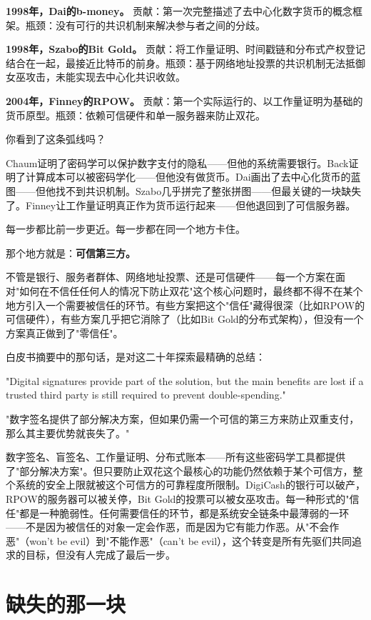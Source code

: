 \documentclass[a4paper,12pt,openany]{ctexbook}
\newenvironment{quoting}{%
  \par\vspace{0.5em}%
  \begin{list}{}{%
    \setlength{\leftmargin}{2em}%
    \setlength{\rightmargin}{2em}%
    \setlength{\parsep}{0.3em}%
    \setlength{\itemsep}{0pt}%
    \setlength{\topsep}{0pt}%
  }%
  \item\relax
}{%
  \end{list}%
  \par\vspace{0.5em}%
}
\begin{document}
\textbf{1998年，Dai的b-money。} 贡献：第一次完整描述了去中心化数字货币的概念框架。瓶颈：没有可行的共识机制来解决参与者之间的分歧。

\textbf{1998年，Szabo的Bit Gold。} 贡献：将工作量证明、时间戳链和分布式产权登记结合在一起，最接近比特币的前身。瓶颈：基于网络地址投票的共识机制无法抵御女巫攻击，未能实现去中心化共识收敛。

\textbf{2004年，Finney的RPOW。} 贡献：第一个实际运行的、以工作量证明为基础的货币原型。瓶颈：依赖可信硬件和单一服务器来防止双花。

你看到了这条弧线吗？

Chaum证明了密码学可以保护数字支付的隐私——但他的系统需要银行。Back证明了计算成本可以被密码学化——但他没有做货币。Dai画出了去中心化货币的蓝图——但他找不到共识机制。Szabo几乎拼完了整张拼图——但最关键的一块缺失了。Finney让工作量证明真正作为货币运行起来——但他退回到了可信服务器。

每一步都比前一步更近。每一步都在同一个地方卡住。

那个地方就是：\textbf{可信第三方。}

不管是银行、服务者群体、网络地址投票、还是可信硬件——每一个方案在面对"如何在不信任任何人的情况下防止双花"这个核心问题时，最终都不得不在某个地方引入一个需要被信任的环节。有些方案把这个"信任"藏得很深（比如RPOW的可信硬件），有些方案几乎把它消除了（比如Bit Gold的分布式架构），但没有一个方案真正做到了"零信任"。

白皮书摘要中的那句话，是对这二十年探索最精确的总结：


\begin{quoting}
\small
"Digital signatures provide part of the solution, but the main benefits are lost if a trusted third party is still required to prevent double-spending."

"数字签名提供了部分解决方案，但如果仍需一个可信的第三方来防止双重支付，那么其主要优势就丧失了。"
\end{quoting}


数字签名、盲签名、工作量证明、分布式账本——所有这些密码学工具都提供了"部分解决方案"。但只要防止双花这个最核心的功能仍然依赖于某个可信方，整个系统的安全上限就被这个可信方的可靠程度所限制。DigiCash的银行可以破产，RPOW的服务器可以被关停，Bit Gold的投票可以被女巫攻击。每一种形式的"信任"都是一种脆弱性。任何需要信任的环节，都是系统安全链条中最薄弱的一环——不是因为被信任的对象一定会作恶，而是因为它有能力作恶。从"不会作恶"（won't be evil）到"不能作恶"（can't be evil），这个转变是所有先驱们共同追求的目标，但没有人完成了最后一步。


\section*{缺失的那一块}
\end{document}

